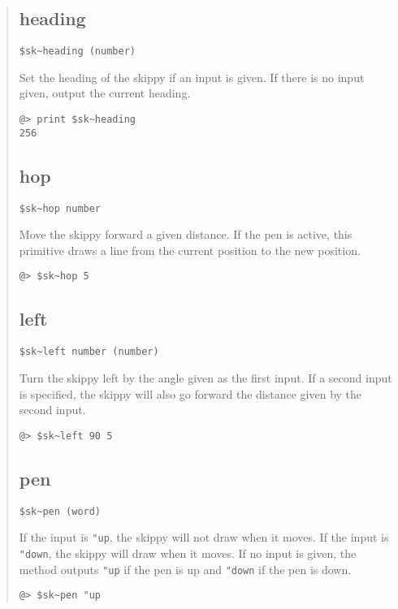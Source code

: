 \documentclass[twoside,10pt,openany]{report}
\newcounter{ex}[chapter]
\begin{document}
\begin{quote}
\subsection*{heading} 
\begin{verbatim}
$sk~heading (number)
\end{verbatim}
Set the heading of the skippy if an input is given.  If there is no input given, output the current heading.
\begin{verbatim}
@> print $sk~heading
256
\end{verbatim}

\subsection*{hop} 
\begin{verbatim}
$sk~hop number
\end{verbatim}
Move the skippy forward a given distance.  If the pen is active, this primitive draws a line from the current position to the new position.
\begin{verbatim}
@> $sk~hop 5
\end{verbatim}

\subsection*{left} 
\begin{verbatim}
$sk~left number (number)
\end{verbatim}
Turn the skippy left by the angle given as the first input. If a second input is specified, the skippy will also go forward the distance given by the second input.
\begin{verbatim}
@> $sk~left 90 5
\end{verbatim}

\subsection*{pen} 
\begin{verbatim}
$sk~pen (word)
\end{verbatim}
If the input is {\tt "up}, the skippy will not draw when it moves.  If the input is {\tt "down}, the skippy will draw when it moves.  If no input is given, the method outputs {\tt "up} if the pen is up and {\tt "down} if the pen is down.
\begin{verbatim}
@> $sk~pen "up
\end{verbatim}


\end{quote}
\end{document}
